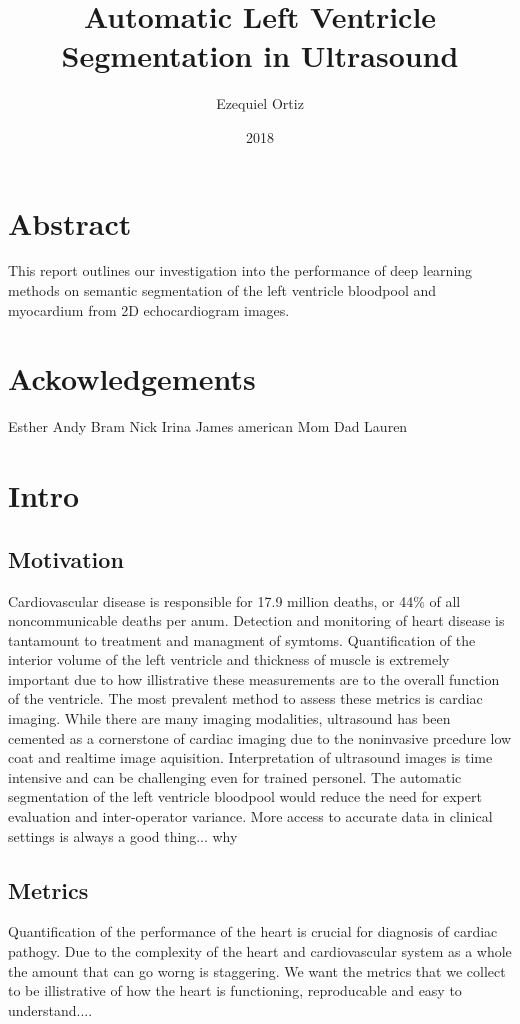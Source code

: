 \documentclass[12pt]{article}
\title{Automatic Left Ventricle Segmentation in Ultrasound}
\date{2018}
\author{Ezequiel Ortiz}
\begin{document}
\maketitle
{}
\newpage
\tableofcontents
\newpage
\doublespacing
{}

\section{Abstract}
This report outlines our investigation into the performance of deep learning methods on semantic segmentation of the left ventricle bloodpool and myocardium from 2D echocardiogram images.
\section{Ackowledgements}
Esther
Andy
Bram
Nick
Irina
James
american
Mom
Dad
Lauren
\section{Intro}
\subsection{Motivation}
Cardiovascular disease is responsible for 17.9 million deaths, or 44\% of all noncommunicable deaths per anum\cite{who_world_health}.
Detection and monitoring of heart disease is tantamount to treatment and managment of symtoms.%
Quantification of the interior volume of the left ventricle and thickness of muscle is extremely important due to how illistrative these measurements are to the overall function of the ventricle.\cite{ase_chamber_quant}
The most prevalent method to assess these metrics is cardiac imaging.
While there are many imaging modalities, ultrasound has been cemented as a cornerstone of cardiac imaging due to the noninvasive prcedure low coat and realtime image aquisition.
Interpretation of ultrasound images is time intensive and can be challenging even for trained personel.
The automatic segmentation of the left ventricle bloodpool %
would reduce the need for expert evaluation and inter-operator variance.%
More access to accurate data in clinical settings is always a good thing... why

\subsection{Metrics}
Quantification of the performance of the heart is crucial for diagnosis of cardiac pathogy.
Due to the complexity of the heart and cardiovascular system as a whole the amount that can go worng is staggering.
We want the metrics that we collect to be illistrative of how the heart is functioning,
reproducable
and easy to understand....%
\end{document}
